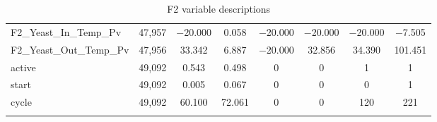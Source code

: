 \begin{table}[!htbp]
{\begin{tabular}{@{\extracolsep{5pt}}lccccccc}
F2\_Yeast\_In\_Temp\_Pv & 47,957 & $-$20.000 & 0.058 & $-$20.000 & $-$20.000 & $-$20.000 & $-$7.505 \\ 
F2\_Yeast\_Out\_Temp\_Pv & 47,956 & 33.342 & 6.887 & $-$20.000 & 32.856 & 34.390 & 101.451 \\ 
active & 49,092 & 0.543 & 0.498 & 0 & 0 & 1 & 1 \\ 
start & 49,092 & 0.005 & 0.067 & 0 & 0 & 0 & 1 \\ 
cycle & 49,092 & 60.100 & 72.061 & 0 & 0 & 120 & 221 \\ 
\hline \\[-1.8ex] 
\end{tabular} 
}
  \caption{F2 variable descriptions} 
  \label{tab:f2} 
\end{table} 